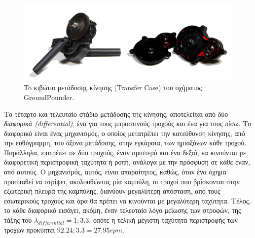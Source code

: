 \begin{figure}[!ht]
	\centering
	\includegraphics[width=0.8\linewidth]{Chapters/Chapter2/Figures/transfer_case.png}
	\caption{To κιβώτιο μετάδοσης κίνησης (Transfer Case) του οχήματος GroundPounder.}
	\label{fig:transfer_case}
\end{figure}

\bigskip
Το τέταρτο και τελευταίο στάδιο μετάδοσης της κίνησης, αποτελείται από δύο \textit{διαφορικά (differential)}, ένα για τους μπροστινούς τροχούς και ένα για τους πίσω. Το {διαφορικό} είναι ένας μηχανισμός, ο οποίος μετατρέπει την κατεύθυνση κίνησης, από την ευθύγραμμη, του άξονα μετάδοσης, στην εγκάρσια, των ημιαξόνων κάθε τροχού. Παράλληλα, επιτρέπει σε δύο τροχούς, έναν αριστερό και ένα δεξιό, να κινούνται με διαφορετική περιστροφική ταχύτητα ή ροπή, ανάλογα με την πρόσφυση σε κάθε έναν, από αυτούς. Ο μηχανισμός, αυτός, είναι απαραίτητος, καθώς, όταν ένα όχημα προσπαθεί να στρίψει, ακολουθώντας μία καμπύλη, οι τροχοί που βρίσκονται στην εξωτερική πλευρά της καμπύλης, διανύουν μεγαλύτερη απόσταση, από τους εσωτερικούς τροχούς και άρα θα πρέπει να κινούνται με μεγαλύτερη ταχύτητα. Τέλος, το κάθε {διαφορικό} εισάγει, ακόμη, έναν τελευταίο λόγο μείωσης των στροφών, της τάξης του $\lambda_{differential}=1:3.3$, οπότε η τελική μέγιστη ταχύτητα περιστροφής των τροχών προκύπτει $92.24:3.3=27.95rpm$.

